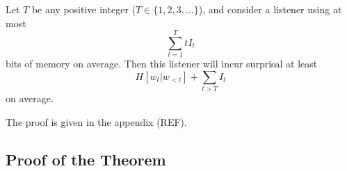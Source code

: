


\begin{thm}\label{prop:suboptimal}
	Let $T$ be any positive integer ($T \in \{1, 2, 3, ...\}$), and consider a listener using at most
	\begin{equation}\label{eq:memory}
		\sum_{t=1}^T t I_t
	\end{equation}
bits of memory on average.
Then this listener will incur surprisal at least
	$$H[w_t|w_{<t}] + \sum_{t > T} I_t$$
	on average.
\end{thm}
The proof is given in the appendix (REF).




\subsection{Proof of the Theorem}



